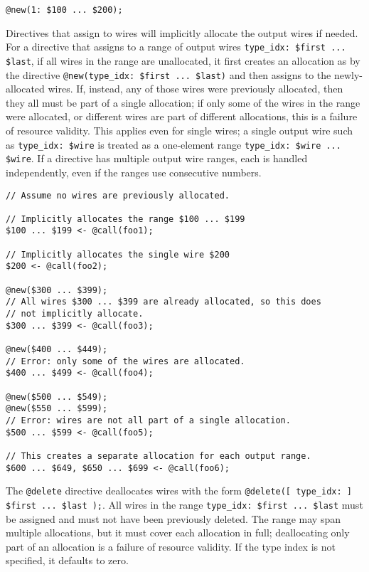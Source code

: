 %
\begin{lstlisting}[language=ir]
@new(1: $100 ... $200);
\end{lstlisting}

Directives that assign to wires will implicitly allocate the output wires if needed.
For a directive that assigns to a range of output wires \texttt{type\_idx: \$first ... \$last},
if all wires in the range are unallocated, it first creates an allocation as by
the directive \texttt{@new(type\_idx: \$first ... \$last)} and then assigns to
the newly-allocated wires.
If, instead, any of those wires were previously allocated, then they all must
be part of a single allocation; if only some of the wires in the range were
allocated, or different wires are part of different allocations, this is a
failure of resource validity.
This applies even for single wires; a single output wire such as \texttt{type\_idx: \$wire}
is treated as a one-element range \texttt{type\_idx: \$wire ... \$wire}.
If a directive has multiple output wire ranges, each is handled independently,
even if the ranges use consecutive numbers.

\begin{lstlisting}[language=ir]
// Assume no wires are previously allocated.

// Implicitly allocates the range $100 ... $199
$100 ... $199 <- @call(foo1);

// Implicitly allocates the single wire $200
$200 <- @call(foo2);

@new($300 ... $399);
// All wires $300 ... $399 are already allocated, so this does
// not implicitly allocate.
$300 ... $399 <- @call(foo3);

@new($400 ... $449);
// Error: only some of the wires are allocated.
$400 ... $499 <- @call(foo4);

@new($500 ... $549);
@new($550 ... $599);
// Error: wires are not all part of a single allocation.
$500 ... $599 <- @call(foo5);

// This creates a separate allocation for each output range.
$600 ... $649, $650 ... $699 <- @call(foo6);
\end{lstlisting}

The \texttt{@delete} directive deallocates wires with the form \texttt{@delete([ type\_idx: ] \$first ... \$last );}.
All wires in the range \texttt{type\_idx: \$first ... \$last} must be assigned
and must not have been previously deleted.
The range may span multiple allocations, but it must cover each allocation in
full; deallocating only part of an allocation is a failure of resource
validity.
If the type index is not specified, it defaults to zero.

